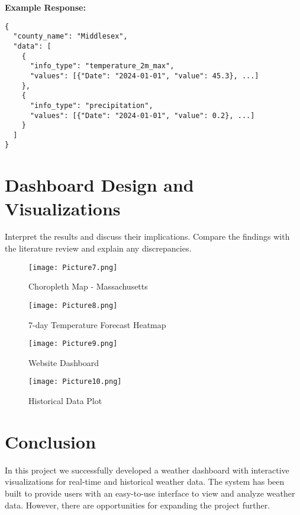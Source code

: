 \documentclass[a4paper, 12pt]{article}
\begin{document}
\textbf{Example Response:}
\begin{verbatim}
{
  "county_name": "Middlesex",
  "data": [
    {
      "info_type": "temperature_2m_max",
      "values": [{"Date": "2024-01-01", "value": 45.3}, ...]
    },
    {
      "info_type": "precipitation",
      "values": [{"Date": "2024-01-01", "value": 0.2}, ...]
    }
  ]
}
\end{verbatim}


\section{Dashboard Design and Visualizations}
\label{sec:Dashboard design and visualizations}
Interpret the results and discuss their implications. Compare the findings with the literature review and explain any discrepancies.

\begin{figure}[H]
\centering
\texttt{[image: Picture7.png]}
\caption{Choropleth Map - Massachusetts}
\label{fig:chloropeth-map}
\end{figure}

\begin{figure}[H]
\centering
\texttt{[image: Picture8.png]}
\caption{7-day Temperature Forecast Heatmap}
\label{fig:temperature-forecast}
\end{figure}

\begin{figure}[H]
\centering
\texttt{[image: Picture9.png]}
\caption{Website Dashboard}
\label{fig:website-dashboard}
\end{figure}

\begin{figure}[H]
\centering
\texttt{[image: Picture10.png]}
\caption{Historical Data Plot}
\label{fig:historical-data-plot}
\end{figure}





\section{Conclusion}
\label{sec:conclusion}

In this project we successfully developed a weather dashboard with interactive visualizations for real-time and historical weather data. The system has been built to provide users with an easy-to-use interface to view and analyze weather data. However, there are opportunities for expanding the project further.
\end{document}
